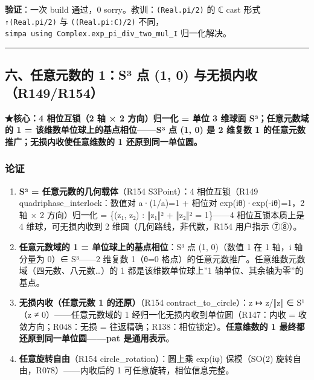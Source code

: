 \documentclass[
]{article}
\providecommand{\tightlist}{%
  \setlength{\itemsep}{0pt}\setlength{\parskip}{0pt}}
\begin{document}
\textbf{验证}：一次 build 通过，0 sorry。教训：\texttt{(Real.pi/2)} 的 ℂ
cast 形式 \texttt{↑(Real.pi/2)} 与 \texttt{((Real.pi:ℂ)/2)}
不同，\texttt{simpa\ using\ Complex.exp\_pi\_div\_two\_mul\_I}
归一化解决。

\begin{center}\rule{0.5\linewidth}{0.5pt}\end{center}

\subsection{六、任意元数的 1：S³ 点 (1, 0)
与无损内收（R149/R154）}\label{ux516dux4efbux610fux5143ux6570ux7684-1suxb3-ux70b9-1-0-ux4e0eux65e0ux635fux5185ux6536r149r154}

\textbf{★核心：4 相位互锁（2 轴 × 2 方向）归一化 = 单位 3 维球面
S³；任意元数域的 1 = 该维数单位球上的基点相位------S³ 点 (1, 0) 是 2
维复数 1 的任意元数推广；无损内收使任意维数的 1 还原到同一单位圆。}

\subsubsection{论证}\label{ux8bbaux8bc1-2}

\begin{enumerate}
\def\labelenumi{\arabic{enumi}.}
\tightlist
\item
  \textbf{S³ = 任意元数的几何载体}（R154 S3Point）：4 相位互锁（R149
  quadriphase\_interlock：数值对 a·(1/a)=1 + 相位对
  exp(iθ)·exp(-iθ)=1，2 轴 × 2 方向）归一化 = \{(z₁, z₂) : ‖z₁‖² + ‖z₂‖²
  = 1\}------4 相位互锁本质上是 4 维球，可无损内收到 2
  维圆（几何路线，非代数，R154 用户指示 ⑦⑧）。
\item
  \textbf{任意元数域的 1 = 单位球上的基点相位}：S³ 点 (1, 0)（数值 1 在
  1 轴，i 轴分量为 0）∈ S³------2 维复数 1（θ=0
  格点）的任意元数推广。任意维数元数域（四元数、八元数\ldots）的 1
  都是该维数单位球上''1 轴单位、其余轴为零''的基点。
\item
  \textbf{无损内收（任意元数 1 的还原）}（R154 contract\_to\_circle）：z
  ↦ z/‖z‖ ∈ S¹（z ≠ 0）------任意元数域的 1
  经归一化无损内收到单位圆（R147：内收 = 收敛方向；R048：无损 =
  往返精确；R138：相位锁定）。\textbf{任意维数的 1
  最终都还原到同一单位圆------pat 是通用表示}。
\item
  \textbf{任意旋转自由}（R154 circle\_rotation）：圆上乘 exp(iφ)
  保模（SO(2) 旋转自由，R078）------内收后的 1
  可任意旋转，相位信息完整。
\end{enumerate}
\end{document}
